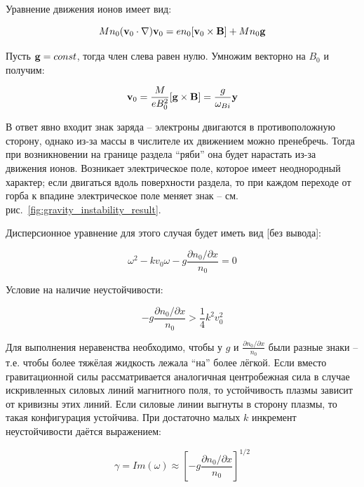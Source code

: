 \documentclass[10pt, a4paper]{article}
\begin{document}
\begin{itemize}
\begin{itemize}
		Уравнение движения ионов имеет вид:
		
		\begin{equation*}
			Mn_0 (\vb{v}_0\cdot\nabla)\vb{v}_0 = en_0[\vb{v}_0\times\vb{B}]+Mn_0\vb{g}
		\end{equation*}
		
		Пусть $\vb{g}=const$, тогда член слева равен нулю. Умножим векторно на $B_0$ и получим:
		
		\begin{equation*}
			\vb{v}_0 = \frac{M}{eB_0^2}[\vb{g}\times\vb{B}] = \frac{g}{\omega_{Bi}}\vb{y}
		\end{equation*}
		
		В ответ явно входит знак заряда -- электроны двигаются в противоположную сторону, однако из-за массы в числителе их движением можно пренебречь. Тогда при возникновении на границе раздела ``ряби'' она будет нарастать из-за движения ионов. Возникает электрическое поле, которое имеет неоднородный
характер; если двигаться вдоль поверхности раздела, то при каждом переходе от горба к впадине электрическое поле меняет знак -- см. рис.~\ref{fig:gravity_instability_result}.
		
		Дисперсионное уравнение для этого случая будет иметь вид [без вывода]:
		
		\begin{equation*}
			\omega^2-kv_0\omega-g\frac{\partial n_0/\partial x}{n_0}=0
		\end{equation*}
	
		Условие на наличие неустойчивости:
		
		\begin{equation*}
			-g\frac{\partial n_0/\partial x}{n_0}>\frac{1}{4}k^2v_0^2
		\end{equation*}
	
		Для выполнения неравенства необходимо, чтобы у $g$ и $\frac{\partial n_0/\partial x}{n_0}$ были разные знаки -- т.е. чтобы более тяжёлая жидкость лежала ``на'' более лёгкой. Если вместо гравитационной силы рассматривается аналогичная центробежная сила в случае искривленных силовых линий магнитного поля, то устойчивость плазмы зависит от кривизны этих линий. Если силовые линии выгнуты
в сторону плазмы, то такая конфигурация устойчива. При достаточно малых $k$ инкремент неустойчивости даётся выражением:
		
		\begin{equation*}
			\gamma = Im(\omega) \approx [-g\frac{\partial n_0/\partial x}{n_0}]^{1/2}
		\end{equation*}
	

\end{itemize}
\end{itemize}
\end{document}
